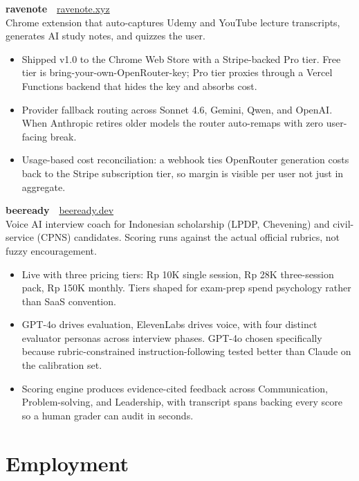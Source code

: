 \documentclass[11pt,a4paper]{article}
\begin{document}
\noindent\textbf{ravenote}\ \ \href{https://ravenote.xyz}{ravenote.xyz}\\
Chrome extension that auto-captures Udemy and YouTube lecture transcripts, generates AI study notes, and quizzes the user.
\begin{itemize}
  \item Shipped v1.0 to the Chrome Web Store with a Stripe-backed Pro tier. Free tier is bring-your-own-OpenRouter-key; Pro tier proxies through a Vercel Functions backend that hides the key and absorbs cost.
  \item Provider fallback routing across Sonnet 4.6, Gemini, Qwen, and OpenAI. When Anthropic retires older models the router auto-remaps with zero user-facing break.
  \item Usage-based cost reconciliation: a webhook ties OpenRouter generation costs back to the Stripe subscription tier, so margin is visible per user not just in aggregate.
\end{itemize}

\noindent\textbf{beeready}\ \ \href{https://beeready.dev}{beeready.dev}\\
Voice AI interview coach for Indonesian scholarship (LPDP, Chevening) and civil-service (CPNS) candidates. Scoring runs against the actual official rubrics, not fuzzy encouragement.
\begin{itemize}
  \item Live with three pricing tiers: Rp 10K single session, Rp 28K three-session pack, Rp 150K monthly. Tiers shaped for exam-prep spend psychology rather than SaaS convention.
  \item GPT-4o drives evaluation, ElevenLabs drives voice, with four distinct evaluator personas across interview phases. GPT-4o chosen specifically because rubric-constrained instruction-following tested better than Claude on the calibration set.
  \item Scoring engine produces evidence-cited feedback across Communication, Problem-solving, and Leadership, with transcript spans backing every score so a human grader can audit in seconds.
\end{itemize}

\section*{Employment}
\end{document}

